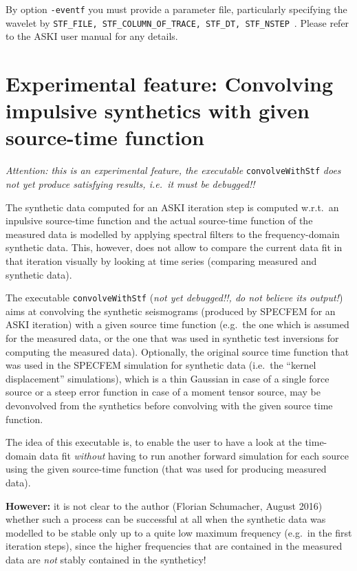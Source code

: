 \documentclass[12pt,a4paper]{article}
\newcommand{\lcode}[1]{\nolinkurl{#1}}
\newcommand{\ASKI}{ {\ttfamily ASKI} }
\begin{document}
By option \lcode{-eventf} you must provide a parameter file, particularly specifying the wavelet by
\lcode{STF_FILE, STF_COLUMN_OF_TRACE, STF_DT, STF_NSTEP}~. Please refer to the \ASKI{} user manual
for any details.

%
\section{Experimental feature: Convolving impulsive synthetics with given source-time function}
%
\emph{Attention: this is an experimental feature, the executable} \lcode{convolveWithStf} \emph{does not yet
produce satisfying results, i.e.\ it must be debugged!!}

The synthetic data computed for an \ASKI{} iteration step is computed w.r.t.\ an inpulsive source-time
function and the actual source-time function of the measured data is modelled by applying spectral filters to
the frequency-domain synthetic data. This, however, does not allow to compare the current data fit in that
iteration visually by looking at time series (comparing measured and synthetic data). 

The executable \lcode{convolveWithStf} (\emph{not yet debugged!!, do not believe its output!}) aims at convolving 
the synthetic seismograms (produced by SPECFEM for an \ASKI{} iteration) with a given source time function (e.g.\ 
the one which is assumed for the measured data, or the one that was used in synthetic test inversions for 
computing the measured data).
Optionally, the original source time function that was used in the SPECFEM simulation for synthetic data (i.e.\
the ``kernel displacement'' simulations), which is a thin Gaussian in case of a single force source or a
steep error function in case of a moment tensor source, may be devonvolved from the synthetics before
convolving with the given source time function. 

The idea of this executable is, to enable the user to have a look at the time-domain data fit \emph{without}
having to run another forward simulation for each source using the given source-time function (that was used
for producing measured data).

{\bf However:} it is not clear to the author (Florian Schumacher, August 2016) whether such a process can be 
successful at all when the synthetic data was modelled to be stable only up to a quite low maximum frequency
(e.g.\ in the first iteration steps), since the higher frequencies that are contained in the measured data 
are \emph{not} stably contained in the syntheticy!
\end{document}
